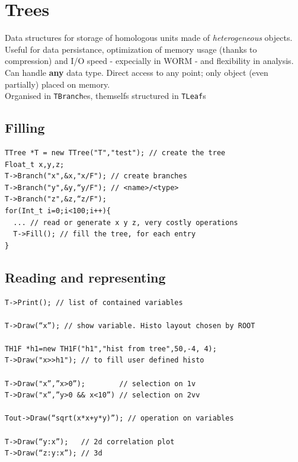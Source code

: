 \documentclass[10pt, twoside]{article}
\begin{document}
\section{Trees}
Data structures for storage of homologous units made of \textit{heterogeneous} objects. Useful for data persistance, optimization of memory usage (thanks to compression) and I/O speed - expecially in WORM - and flexibility in analysis.
\\Can handle \textbf{any} data type. Direct access to any point; only object (even partially) placed on memory.
\\Organised in \texttt{TBranch}es, themselfs structured in \texttt{TLeaf}s

\subsection{Filling}
\begin{verbatim}
TTree *T = new TTree("T","test"); // create the tree 
Float_t x,y,z;
T->Branch("x",&x,"x/F"); // create branches 
T->Branch("y",&y,“y/F"); // <name>/<type>
T->Branch("z",&z,“z/F"); 
for(Int_t i=0;i<100;i++){
  ... // read or generate x y z, very costly operations
  T->Fill(); // fill the tree, for each entry
}
\end{verbatim}

\subsection{Reading and representing}
\begin{verbatim}
T->Print(); // list of contained variables

T->Draw(“x”); // show variable. Histo layout chosen by ROOT

TH1F *h1=new TH1F("h1","hist from tree",50,-4, 4); 
T->Draw("x>>h1"); // to fill user defined histo

T->Draw("x”,”x>0”);        // selection on 1v
T->Draw("x”,”y>0 && x<10”) // selection on 2vv

Tout->Draw(“sqrt(x*x+y*y)”); // operation on variables

T->Draw(“y:x”);   // 2d correlation plot
T->Draw(“z:y:x”); // 3d
\end{verbatim}
\end{document}
